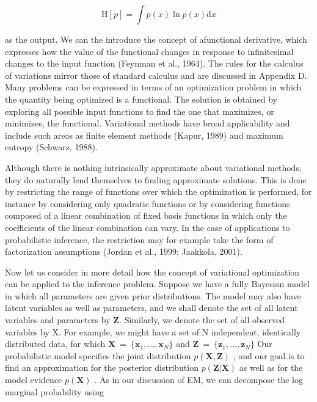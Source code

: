 \documentclass[
  10
]{article}
\begin{document}
\[
\mathrm{H} [ p ] = \int p (x) \ln p (x) \mathrm{d} x\tag{10.1}
\]

as the output. We can the introduce the concept of afunctional
derivative, which expresses how the value of the functional changes in
response to infinitesimal changes to the input function (Feynman et al.,
1964). The rules for the calculus of variations mirror those of standard
calculus and are discussed in Appendix D. Many problems can be expressed
in terms of an optimization problem in which the quantity being
optimized is a functional. The solution is obtained by exploring all
possible input functions to find the one that maximizes, or minimizes,
the functional. Variational methods have broad applicability and include
such areas as finite element methods (Kapur, 1989) and maximum entropy
(Schwarz, 1988).

Although there is nothing intrinsically approximate about variational
methods, they do naturally lend themselves to finding approximate
solutions. This is done by restricting the range of functions over which
the optimization is performed, for instance by considering only
quadratic functions or by considering functions composed of a linear
combination of fixed basis functions in which only the coefficients of
the linear combination can vary. In the case of applications to
probabilistic inference, the restriction may for example take the form
of factorization assumptions (Jordan et al., 1999; Jaakkola, 2001).

Now let us consider in more detail how the concept of variational
optimization can be applied to the inference problem. Suppose we have a
fully Bayesian model in which all parameters are given prior
distributions. The model may also have latent variables as well as
parameters, and we shall denote the set of all latent variables and
parameters by \(\mathbf { Z } .\) Similarly, we denote the set of all
observed variables by X. For example, we might have a set of N
independent, identically distributed data, for which
\(\mathbf { X } ~ = ~ \{ \mathbf { x } _ { 1 } , \ldots , \mathbf { x } _ { N } \}\)
and
\(\mathbf { Z } \ = \ \{ \mathbf { z } _ { 1 } , \ldots , \mathbf { z } _ { N } \}\)
Our probabilistic model specifies the joint distribution
\(p ( \mathbf { X } , \mathbf { Z } )\) , and our goal is to find an
approximation for the posterior distribution
\(p ( \mathbf { Z } | \mathbf { X } )\) as well as for the model
evidence \(p ( \mathbf { X } )\) . As in our discussion of EM, we can
decompose the log marginal probability using
\end{document}
